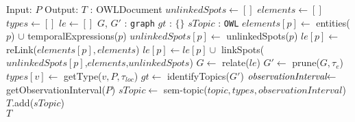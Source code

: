 \setphaserulewidth{0.4pt}

\begin{breakablealgorithm}
\label{alg:process-software-artifacts}
\begin{algorithmic}[1]
\State Input: $P$  
\State Output: $T$ : OWLDocument 
\State $\textit{unlinkedSpots} \leftarrow []$ 
\State $\textit{elements} \leftarrow []$ 
\State $\textit{types} \leftarrow []$ 
\State $le \leftarrow []$ 
\State $G$, $G'$ : \texttt{graph} 
\State $\textit{gt}$ : $\{\}$  
\State $\textit{sTopic}$ : \texttt{OWL}  
 \label{algl:a}
\State $\textit{elements}[p] \leftarrow$ entities($p$) $\cup$ temporalExpressions($p$) 
\State $\textit{unlinkedSpots}[p] \leftarrow$ unlinkedSpots($p$) 
\EndFor \label{algl:b}
 \label{algl:c}
\State $\textit{le}[p] \leftarrow$ reLink($\textit{elements}[p],\textit{elements}$) 
\State $\textit{le}[p] \leftarrow \textit{le}[p] \cup$ linkSpots($\textit{unlinkedSpots}[p]\textit{,elements,unlinkedSpots}$)
\EndFor \label{algl:d}
\State $G \leftarrow $  relate($le$) \label{algl:e}  
\State $G' \leftarrow $  prune($G,\tau_{e}$)  \label{algl:f}
 \label{algl:g}
\State $types[v] \leftarrow $  getType($v,P,\tau_{loc}$)
\EndFor \label{algl:h}
\State $gt \leftarrow $  identifyTopics($G'$)  \label{algl:i}
\State $\textit{observationInterval} \hspace{-0.1cm} \leftarrow$  \hspace{-0.2cm} getObservationInterval($P$) \label{algl:m}
 \label{algl:j}
\State $\mathit{sTopic} \leftarrow $  sem-topic($topic,types,\textit{observationInterval}$)
\State $T$.add($\mathit{sTopic}$) 
\EndFor \label{algl:k}
\\ \Return $T$
\end{algorithmic}
\end{breakablealgorithm}
